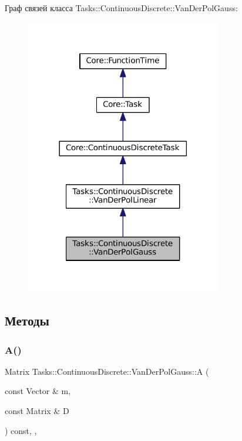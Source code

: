 Граф связей класса Tasks\+:\+:Continuous\+Discrete\+:\+:Van\+Der\+Pol\+Gauss\+:\nopagebreak
\begin{figure}[H]
\begin{center}
\leavevmode
\includegraphics[width=242pt]{class_tasks_1_1_continuous_discrete_1_1_van_der_pol_gauss__coll__graph}
\end{center}
\end{figure}


\subsection{Методы}
\hypertarget{class_tasks_1_1_continuous_discrete_1_1_van_der_pol_gauss_acb431d1a24b276610f6b7c7ff343fb9f}{}\label{class_tasks_1_1_continuous_discrete_1_1_van_der_pol_gauss_acb431d1a24b276610f6b7c7ff343fb9f} 
\subsubsection{\texorpdfstring{A()}{A()}}
{\footnotesize\ttfamily Matrix Tasks\+::\+Continuous\+Discrete\+::\+Van\+Der\+Pol\+Gauss\+::A (\begin{DoxyParamCaption}\item[{const Vector \&}]{m,  }\item[{const Matrix \&}]{D }\end{DoxyParamCaption}) const\hspace{0.3cm}{\ttfamily [override]}, {\ttfamily [protected]}, {\ttfamily [virtual]}}



